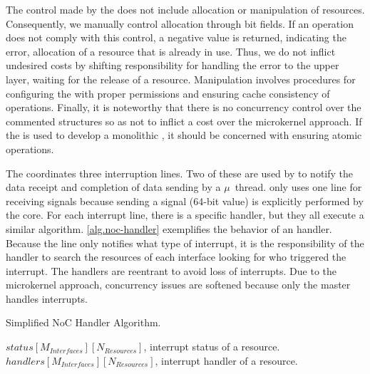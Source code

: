 			The control made by the \hypervisor does not include allocation or manipulation
			of resources. Consequently, we manually control allocation through bit fields.
			If an operation does not comply with this control, a negative value is returned,
			indicating the error, \eg allocation of a resource that is already in use.
			Thus, we do not inflict undesired costs by shifting responsibility for handling
			the error to the upper layer, \eg waiting for the release of a resource.
			Manipulation involves procedures for configuring the \dma with proper
			permissions and ensuring cache consistency of operations. Finally, it is
			noteworthy that there is no concurrency control over the commented
			structures so as not to inflict a cost over the microkernel approach.
			If the \nanvix \hal is used to develop a monolithic \os, it should be
			concerned with ensuring atomic operations.

			The \dma coordinates three interruption lines. Two of these are used by
			\dnoc to notify the data receipt and completion of data sending by a
			$\mu$~thread. \cnoc only uses one line for receiving signals because
			sending a signal (64-bit value) is explicitly performed by the core.
			For each interrupt line, there is a specific handler, but they all
			execute a similar algorithm. \autoref{alg.noc-handler} exemplifies
			the behavior of an \noc handler. Because the line only notifies what
			type of interrupt, it is the responsibility of the handler to search
			the resources of each interface looking for who triggered the interrupt.
			The handlers are reentrant to avoid loss of interrupts. Due to the
			microkernel approach, concurrency issues are softened because only
			the master handles interrupts.

			\begin{algorithm}[!tb]
				\caption{Simplified NoC Handler Algorithm.}%
				\label{alg.noc-handler}%
				\begin{algorithmic}[1]
					\Require $status[M_{Interfaces}][N_{Resources}]$, interrupt status of a resource.
					\Require $handlers[M_{Interfaces}][N_{Resources}]$, interrupt handler of a resource.
							\EndIf
						\EndFor
					\EndFor
					\EndProcedure
				\end{algorithmic}%
			\end{algorithm}

